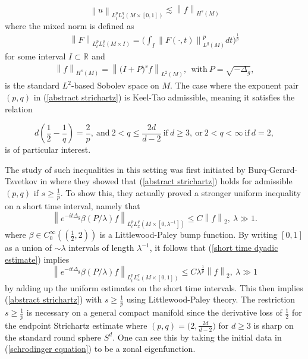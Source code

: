 \documentclass[11pt]{amsart}
\numberwithin{equation}{section}
\newcommand{\la}{\lambda}
\newcommand\norm[1]{\left\lVert#1\right\rVert}
\newcommand{\lpnorm}[3]{\norm{#1}_{L^{#2}(#3)}}
\newcommand{\altlpnorm}[2]{\norm{#1}_{#2}}
\newcommand{\mixlpnorm}[4]{\norm{#1}_{L^{#2}_{t} L^{#3}_{x}(#4)}}
\newcommand{\R}[1][]{\mathbb{R}^#1}
\newcommand{\laplac}[1]{\Delta_{#1}}
\begin{document}
\begin{equation} \label{abstract strichartz}
    \mixlpnorm{u}{p}{q}{M \times [0,1]} \lesssim \norm{f}_{H^s(M)}
\end{equation}
where the mixed norm is defined as
\begin{align*}
    \mixlpnorm{F}{p}{q}{M \times I} = \Big(\int_{I}\norm{F(\cdot, t)}_{L^{q}(M)}^pdt\Big)^{\frac{1}{p}}
\end{align*}
for some interval $I \subset \R{}$
and 
\begin{align*}
    \norm{f}_{H^s(M)} = \lpnorm{\big( I + P\big)^{s}f}{2}{M}, \ \ \text{with} \ P = \sqrt{-\laplac{g}}, 
\end{align*}
is the standard $L^2$-based Sobolev space on $M$. The case where the exponent pair $(p,q)$ in (\ref{abstract strichartz}) is Keel-Tao admissible, meaning it satisfies the relation

\begin{equation}
    d\left(\frac{1}{2} - \frac{1}{q}\right) = \frac{2}{p}, \ \text{and} \ 2 < q \leq \frac{2d}{d-2} \  \text{if} \ d \geq 3, \ \text{or} \ 2 < q < \infty \ \text{if} \ d = 2,
\end{equation}
is of particular interest. 

The study of such inequalities in this setting was first initiated by Burq-Gerard-Tzvetkov in \cite{bgtstrichartzmanifold} where they showed that (\ref{abstract strichartz}) holds for admissible $(p,q)$ if $s \geq \frac{1}{p}$. To show this, they actually proved a stronger uniform inequality on a short time interval, namely that
\begin{equation} \label{short time dyadic estimate}
    \mixlpnorm{e^{-it\laplac{g}} \beta(P/ \la)f}{p}{q}{M \times [0, \la^{-1}]} \leq C \altlpnorm{f}{2} , \ \la \gg 1.
\end{equation}
where $\beta \in C^{\infty}_{0}((\frac{1}{2}, 2))$ is a Littlewood-Paley bump function. By writing $[0,1]$ as a union of $\sim \la$ intervals of length $\la^{-1}$, it follows that (\ref{short time dyadic estimate}) implies
\begin{equation}
    \mixlpnorm{e^{-it\laplac{g}} \beta(P/ \la)f}{p}{q}{M \times [0, 1]} \leq C \la^{\frac{1}{p}} \altlpnorm{f}{2} , \ \la \gg 1
\end{equation}
by adding up the uniform estimates on the short time intervals. This then implies (\ref{abstract strichartz}) with $s \geq \frac{1}{p}$ using Littlewood-Paley theory. The restriction $s \geq \frac{1}{p}$ is necessary on a general compact manifold since the derivative loss of $\frac{1}{2}$ for the endpoint Strichartz estimate where $(p,q) = \big(2, \frac{2d}{d-2}\big)$ for $d \geq 3$ is sharp on the standard round sphere $S^d$. One can see this by taking the initial data in (\ref{schrodinger equation}) to be a zonal eigenfunction. 
\end{document}
